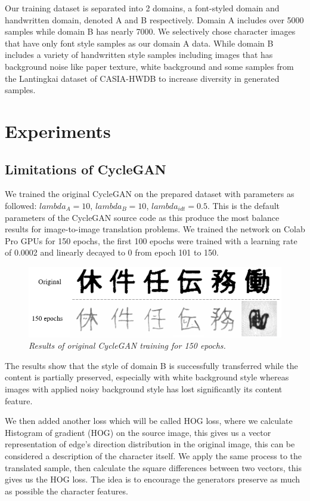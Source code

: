 \documentclass[12pt]{report}
\begin{document}
Our training dataset is separated into 2 domains, a font-styled domain and handwritten domain, denoted A and B respectively. Domain A includes over 5000 samples while domain B has nearly 7000. We selectively chose character images that have only font style samples as our domain A data. While domain B includes a variety of handwritten style samples including images that has background noise like paper texture, white background and some samples from the Lantingkai dataset of CASIA-HWDB\cite{casia} to increase diversity in generated samples.

\section{Experiments}

\subsection{Limitations of CycleGAN}

We trained the original CycleGAN on the prepared dataset with parameters as followed: $lambda_A = 10$, $lambda_B = 10$, $lambda_{idt} = 0.5$. This is the default parameters of the CycleGAN source code as this produce the most balance results for image-to-image translation problems. We trained the network on Colab Pro GPUs for 150 epochs, the first 100 epochs were trained with a learning rate of 0.0002 and linearly decayed to 0 from epoch 101 to 150.

\begin{figure}[h]
	\centering
	\includegraphics[scale=0.8]{150-epochs}
	\caption{\textit{Results of original CycleGAN training for 150 epochs.}}
	\label{fig:150-epochs}
\end{figure}

The results show that the style of domain B is successfully transferred while the content is partially preserved, especially with white background style whereas images with applied noisy background style has lost significantly its content feature. 

We then added another loss which will be called HOG loss, where we calculate Histogram of gradient (HOG) \cite{hog} on the source image, this gives us a vector representation of edge's direction distribution in the original image, this can be considered a description of the character itself. We apply the same process to the translated sample, then calculate the square differences between two vectors, this gives us the HOG loss. The idea is to encourage the generators preserve as much as possible the character features.
\end{document}
